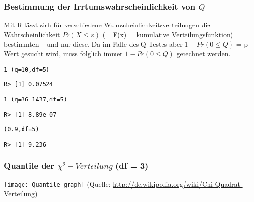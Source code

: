 \begin{frame}
  \frametitle{Bestimmung der Irrtumswahrscheinlichkeit von $Q$}
\begin{footnotesize}
Mit R lässt sich für verschiedene Wahrscheinlichkeitsverteilungen die Wahrscheinlichkeit $Pr(X \leq x)$ (= F(x) =
kumulative Verteilungsfunktion) bestimmten -- und nur diese. Da im Falle des Q-Testes aber $1-Pr(0 \leq Q)$ = p-Wert
gesucht wird, muss folglich immer $1-Pr(0 \leq
Q)$ gerechnet werden.

\begin{knitrout}
\color{fgcolor}\begin{kframe}
\begin{alltt}
1-(q = 10, df = 5)
\end{alltt}
\begin{verbatim}
R> [1] 0.07524
\end{verbatim}
\begin{alltt}

1-(q = 36.1437, df = 5)
\end{alltt}
\begin{verbatim}
R> [1] 8.89e-07
\end{verbatim}
\begin{alltt}

(0.9, df  = 5)
\end{alltt}
\begin{verbatim}
R> [1] 9.236
\end{verbatim}
\end{kframe}
\end{knitrout}

\end{footnotesize}
\end{frame}


\begin{frame}[shrink = 5]
  \frametitle{Quantile der $\chi^2-Verteilung$ (df = 3)}
  \texttt{[image: Quantile\_graph]}
\newline(Quelle: \url{http://de.wikipedia.org/wiki/Chi-Quadrat-Verteilung})
\end{frame}





